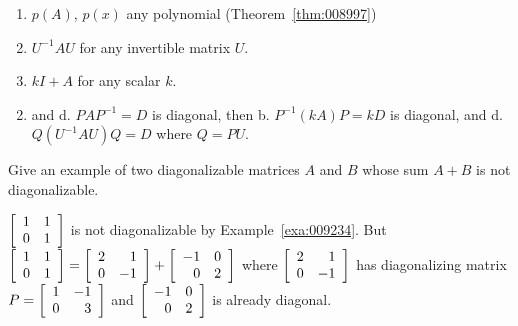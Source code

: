 \begin{multicols}{2}
\begin{ex}
\begin{enumerate}[label={\alph*.}]
\item $p(A)$, $p(x)$ any polynomial (Theorem~\ref{thm:008997})

\item $U^{-1}AU$ for any invertible matrix $U$.

\item $kI + A$ for any scalar $k$.

\end{enumerate}
\begin{sol}
\begin{enumerate}[label={\alph*.}]
\setcounter{enumi}{1}
\item  and d. $PAP^{-1} = D$ is diagonal, then b. $P^{-1}(kA)P = kD$ is diagonal, and  d. $Q(U^{-1}AU)Q = D$ where $Q = PU$.

\end{enumerate}
\end{sol}
\end{ex}

\begin{ex}
Give an example of two diagonalizable matrices $A$ and $B$ whose sum $A + B$ is not diagonalizable.

\begin{sol}
$\left[ \begin{array}{cc}
1 & 1 \\
0 & 1 
\end{array}\right]$
 is not diagonalizable by Example~\ref{exa:009234}. But $\left[ \begin{array}{rr}
1 & 1 \\
0 & 1 
\end{array}\right] = \left[ \begin{array}{rr}
2 & 1 \\
0 & -1 
\end{array}\right] + \left[ \begin{array}{rr}
-1 & 0 \\
0 & 2 
\end{array}\right]$
 where $\left[ \begin{array}{rr} 
2 & 1 \\
0 & -1 
\end{array}\right]$  has diagonalizing matrix $P = \left[ \begin{array}{rr}
1 & -1 \\
0 & 3 
\end{array}\right]$
 and $\left[ \begin{array}{rr}
-1 & 0 \\
0 & 2 
\end{array}\right]$
 is already diagonal.
\end{sol}
\end{ex}


\end{multicols}
